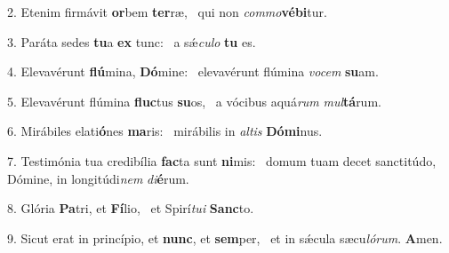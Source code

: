 2. Etenim firmávit \textbf{or}bem \textbf{ter}ræ, \ast\  qui non \textit{com}\textit{mo}\textbf{vé}\textbf{bi}tur.\

3. Paráta sedes \textbf{tu}a \textbf{ex} tunc: \ast\  a sǽ\textit{cu}\textit{lo} \textbf{tu} es.\

4. Elevavérunt \textbf{flú}mina, \textbf{Dó}mine: \ast\  elevavérunt flúmina \textit{vo}\textit{cem} \textbf{su}am.\

5. Elevavérunt flúmina \textbf{fluc}tus \textbf{su}os, \ast\  a vócibus aquá\textit{rum} \textit{mul}\textbf{tá}rum.\

6. Mirábiles elati\textbf{ó}nes \textbf{ma}ris: \ast\  mirábilis in \textit{al}\textit{tis} \textbf{Dó}\textbf{mi}nus.\

7. Testimónia tua credibília \textbf{fac}ta sunt \textbf{ni}mis: \ast\  domum tuam decet sanctitúdo, Dómine, in longitúdi\textit{nem} \textit{di}\textbf{é}rum.\

8. Glória \textbf{Pa}tri, et \textbf{Fí}lio, \ast\  et Spirí\textit{tu}\textit{i} \textbf{Sanc}to.\

9. Sicut erat in princípio, et \textbf{nunc}, et \textbf{sem}per, \ast\  et in sǽcula sæcu\textit{ló}\textit{rum}. \textbf{A}men.\

